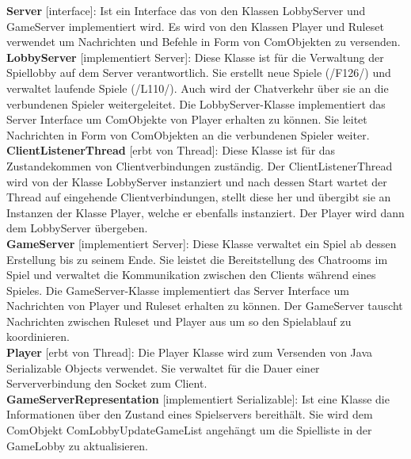 \documentclass{article}
\begin{document}
\textbf{Server} [interface]: Ist ein Interface das von den Klassen LobbyServer und GameServer implementiert wird. Es wird von den Klassen Player und Ruleset verwendet um Nachrichten und Befehle in Form von ComObjekten zu versenden. \\
		
\textbf{LobbyServer} [implementiert Server]: Diese Klasse ist für die Verwaltung der Spiellobby auf dem Server verantwortlich. Sie erstellt neue Spiele (/F126/) und verwaltet laufende Spiele (/L110/). Auch wird der Chatverkehr über sie an die verbundenen Spieler weitergeleitet. Die LobbyServer-Klasse implementiert das Server Interface um ComObjekte von Player erhalten zu können. Sie leitet Nachrichten in Form von ComObjekten an die verbundenen Spieler weiter. \\

\textbf{ClientListenerThread} [erbt von Thread]: Diese Klasse ist für das Zustandekommen von Clientverbindungen zuständig. Der ClientListenerThread wird von der Klasse LobbyServer instanziert und nach dessen Start wartet der Thread auf eingehende Clientverbindungen, stellt diese her und übergibt sie an Instanzen der Klasse Player, welche er ebenfalls instanziert. Der Player wird dann dem LobbyServer übergeben. \\

\textbf{GameServer} [implementiert Server]: Diese Klasse verwaltet ein Spiel ab dessen Erstellung bis zu seinem Ende. Sie leistet die Bereitstellung des Chatrooms im Spiel und verwaltet die Kommunikation zwischen den Clients während eines Spieles. Die GameServer-Klasse implementiert das Server Interface um Nachrichten von Player und Ruleset erhalten zu können. Der GameServer tauscht Nachrichten zwischen Ruleset und Player aus um so den Spielablauf zu koordinieren.\\

\textbf{Player} [erbt von Thread]: Die Player Klasse wird zum Versenden von Java Serializable Objects verwendet. Sie verwaltet für die Dauer einer Serververbindung den Socket zum Client. \\

\textbf{GameServerRepresentation} [implementiert Serializable]: Ist eine Klasse die Informationen über den Zustand eines Spielservers bereithält. Sie wird dem ComObjekt ComLobbyUpdateGameList angehängt um die Spielliste in der GameLobby zu aktualisieren.
\end{document}

